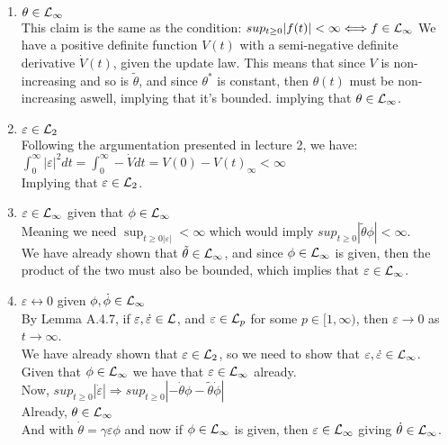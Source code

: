 \begin{enumerate}
    \item $\theta \in \mathcal{L}_{\infty}$ \\
    This claim is the same as the condition: $sup_{t\geq0} |f(t)| < \infty  \Longleftrightarrow f \in \mathcal{L}_{\infty}$
    We have a positive definite function $V(t)$ with a semi-negative definite derivative $\dot{V}(t)$, given the update law.  
    This means that since $V$ is non-increasing and so is $\tilde{\theta}$, and since $\theta ^*$ is constant, then $\theta(t)$ must be non-increasing aswell, implying that it's bounded.
    implying that $\theta \in \mathcal{L}_{\infty}$.
    
    \item $\varepsilon \in \mathcal{L}_{2}$ \\
    Following the argumentation presented in lecture 2, we have: \\
    \begin{math}
        \int_{0}^{\infty}|\varepsilon|^2 dt = \int_{0}^{\infty} -\dot{V} dt = V(0) - V(t)_{\infty} < \infty
    \end{math} \\
    Implying that $\varepsilon \in \mathcal{L}_{2}$.

    \item $\varepsilon \in \mathcal{L}_{\infty}$ given that $\phi \in \mathcal{L}_{\infty}$ \\
    Meaning we need $\sup_{t\geq0 |\varepsilon|} < \infty$ which would imply $sup_{t \geq 0 } |\tilde{\theta} \phi| < \infty$. \\ 
    We have already shown that $\tilde{\theta} \in \mathcal{L}_{\infty}$, and since $\phi \in \mathcal{L}_{\infty}$ is given, then the product of the two must also be bounded, which implies that $\varepsilon \in \mathcal{L}_{\infty}$.

    \item $\varepsilon \leftrightarrow 0$ given $\phi , \dot{\phi} \in \mathcal{L}_{\infty}$ \\ 
    By Lemma A.4.7, if $\varepsilon, \dot{\varepsilon} \in \mathcal{L}$, and $\varepsilon \in \mathcal{L}_p$ for some $p \in [1, \infty)$, then $\varepsilon \rightarrow 0$ as $t \rightarrow \infty$. \\
    We have already shown that $\varepsilon \in \mathcal{L}_2$, so we need to show that $\varepsilon, \dot{\varepsilon} \in \mathcal{L}_{\infty}$. \\
    Given that $\phi \in \mathcal{L}_{\infty}$ we have that $\varepsilon \in \mathcal{L}_{\infty}$ already. \\
    Now, $sup_{t \geq 0} |\dot{\varepsilon}| \Rightarrow sup_{t \geq 0} |-\dot{\theta}\phi - \tilde{\theta}\dot{\phi}|$  \\
    Already, $\theta \in \mathcal{L}_{\infty}$ \\ 
    And with $\dot{\theta} = \gamma \varepsilon \phi$ and now if $\phi \in \mathcal{L}_{\infty}$ is given, then $\varepsilon \in \mathcal{L}_{\infty}$ giving $\dot{\theta} \in \mathcal{L}_{\infty}$. \\
    

\end{enumerate}
